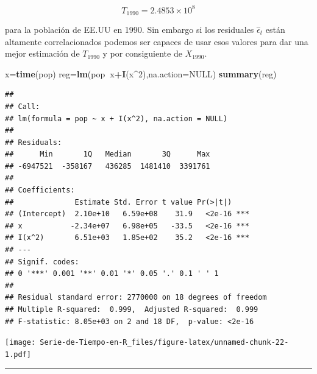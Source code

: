 \documentclass[12pt,]{krantz}
\makeatletter
\newenvironment{Shaded}{\begin{snugshade}}{\end{snugshade}}
\newcommand{\KeywordTok}[1]{\textcolor[rgb]{0.13,0.29,0.53}{\textbf{#1}}}
\newcommand{\DataTypeTok}[1]{\textcolor[rgb]{0.13,0.29,0.53}{#1}}
\newcommand{\DecValTok}[1]{\textcolor[rgb]{0.00,0.00,0.81}{#1}}
\newcommand{\StringTok}[1]{\textcolor[rgb]{0.31,0.60,0.02}{#1}}
\newcommand{\OtherTok}[1]{\textcolor[rgb]{0.56,0.35,0.01}{#1}}
\newcommand{\OperatorTok}[1]{\textcolor[rgb]{0.81,0.36,0.00}{\textbf{#1}}}
\newcommand{\NormalTok}[1]{#1}
\newenvironment{kframe}{%
\medskip{}
\setlength{\fboxsep}{.8em}
 \def\at@end@of@kframe{}%
 \ifinner\ifhmode%
  \def\at@end@of@kframe{\end{minipage}}%
  \begin{minipage}{\columnwidth}%
 \fi\fi%
 \def\FrameCommand##1{\hskip\@totalleftmargin \hskip-\fboxsep
 \colorbox{shadecolor}{##1}\hskip-\fboxsep
     \hskip-\linewidth \hskip-\@totalleftmargin \hskip\columnwidth}%
 \MakeFramed {\advance\hsize-\width
   \@totalleftmargin\z@ \linewidth\hsize
   \@setminipage}}%
 {\par\unskip\endMakeFramed%
 \at@end@of@kframe}
\renewenvironment{Shaded}{\begin{kframe}}{\end{kframe}}
\theoremstyle{definition}
\theoremstyle{definition}
\theoremstyle{definition}
\theoremstyle{remark}
\makeatother
\begin{document}
\[T_{1990} = 2.4853\times10^8\]

para la población de EE.UU en 1990. Sin embargo si los residuales
\(\hat{\epsilon}_t\) están altamente correlacionados podemos ser capaces
de usar esos valores para dar una mejor estimación de \(T_{1990}\) y por
consiguiente de \(X_{1990}\).

\begin{Shaded}
\begin{Highlighting}[]
\NormalTok{x=}\KeywordTok{time}\NormalTok{(pop)}
\NormalTok{reg=}\KeywordTok{lm}\NormalTok{(pop}\OperatorTok{~}\NormalTok{x}\OperatorTok{+}\KeywordTok{I}\NormalTok{(x}\OperatorTok{^}\DecValTok{2}\NormalTok{),}\DataTypeTok{na.action=}\OtherTok{NULL}\NormalTok{)}
\KeywordTok{summary}\NormalTok{(reg)}
\end{Highlighting}
\end{Shaded}

\begin{verbatim}
## 
## Call:
## lm(formula = pop ~ x + I(x^2), na.action = NULL)
## 
## Residuals:
##      Min       1Q   Median       3Q      Max 
## -6947521  -358167   436285  1481410  3391761 
## 
## Coefficients:
##              Estimate Std. Error t value Pr(>|t|)    
## (Intercept)  2.10e+10   6.59e+08    31.9   <2e-16 ***
## x           -2.34e+07   6.98e+05   -33.5   <2e-16 ***
## I(x^2)       6.51e+03   1.85e+02    35.2   <2e-16 ***
## ---
## Signif. codes:  
## 0 '***' 0.001 '**' 0.01 '*' 0.05 '.' 0.1 ' ' 1
## 
## Residual standard error: 2770000 on 18 degrees of freedom
## Multiple R-squared:  0.999,  Adjusted R-squared:  0.999 
## F-statistic: 8.05e+03 on 2 and 18 DF,  p-value: <2e-16
\end{verbatim}

\begin{Shaded}
\end{Shaded}

\texttt{[image: Serie-de-Tiempo-en-R\_files/figure-latex/unnamed-chunk-22-1.pdf]}

\begin{center}\rule{0.5\linewidth}{\linethickness}\end{center}
\end{document}
